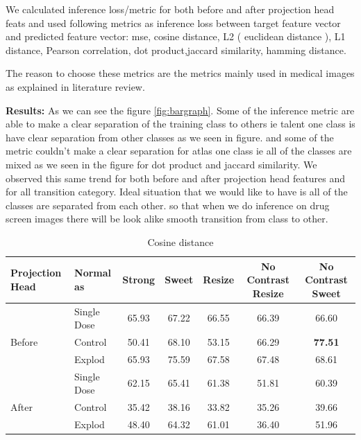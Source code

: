 We calculated inference loss/metric for both  before and after projection head feats and used following metrics as inference loss between target feature vector and predicted feature vector: mse, cosine distance, L2 ( euclidean distance ), L1 distance, Pearson correlation, dot product,jaccard similarity, hamming distance.

The reason to choose these metrics are the metrics mainly used in medical images as explained in literature review.

\textbf{Results:}
 As we can see the figure \ref{fig:bargraph}. Some of the inference metric are able to make a clear separation of the training class to others ie talent one class is have clear separation from other classes as we seen in figure. and some of the metric couldn't make a clear separation for atlas one class ie all of the classes are mixed as we seen in the figure for dot product and jaccard similarity. We observed this same trend  for both before and after projection head features and for all transition category. Ideal situation that we would like to have is all of the classes are separated from each other. so that when we do inference on drug screen images there will be look alike smooth transition from class to other.

\begin{table}[H]
  \centering
  \begin{tabular}{@{}llccccc@{}}
  \toprule
  Projection Head & Normal as       & Strong & Sweet & Resize & No Contrast Resize & No Contrast Sweet \\ \midrule
                  & Single Dose    & 65.93      & 67.22     & 66.55      & 66.39                  & 66.60                 \\
  Before          & Control        & 50.41      & 68.10     & 53.15      & 66.29                  & \textbf{77.51}                 \\
                  & Explod         & 65.93      & 75.59     & 67.58      & 67.48                  & 68.61                 \\ \midrule
                  & Single Dose    & 62.15      & 65.41     & 61.38      & 51.81                  & 60.39                 \\
  After           & Control        & 35.42      & 38.16    & 33.82      & 35.26                  & 39.66                 \\
                  & Explod         & 48.40      & 64.32     & 61.01      & 36.40                  & 51.96                 \\ \bottomrule
  \end{tabular}
  \caption{Cosine distance}
  \label{tab:table_cosine}
\end{table}

